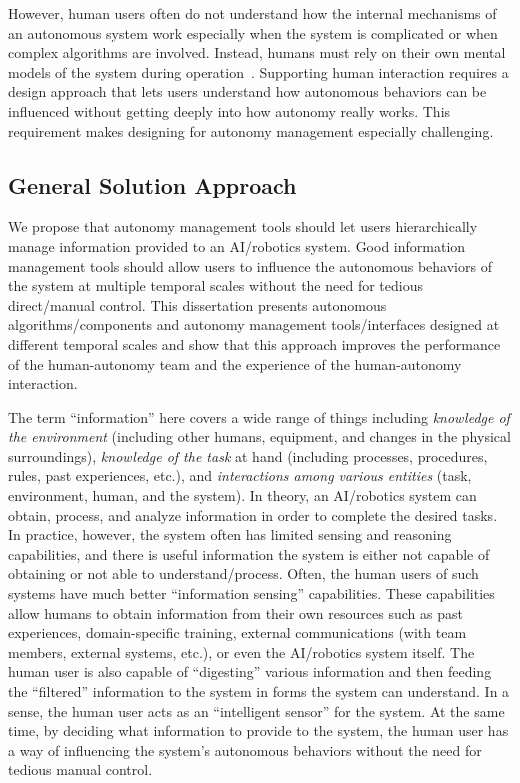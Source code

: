 However, human users often do not understand how the internal mechanisms of an autonomous system work especially when the system is complicated or when complex algorithms are involved. Instead, humans must rely on their own mental models of the system during operation~\cite{Moray1999Mental}. Supporting human interaction requires a design approach that lets users understand how autonomous behaviors can be influenced without getting deeply into how autonomy really works. This requirement makes designing for autonomy management especially challenging.

\subsection{General Solution Approach}

We propose that autonomy management tools should let users hierarchically manage information provided to an AI/robotics system. Good information management tools should allow users to influence the autonomous behaviors of the system at multiple temporal scales without the need for tedious direct/manual control. This dissertation presents autonomous algorithms/components and autonomy management tools/interfaces designed at different temporal scales and show that this approach improves the performance of the human-autonomy team and the experience of the human-autonomy interaction.

The term ``information'' here covers a wide range of things including \textit{knowledge of the environment} (including other humans, equipment, and changes in the physical surroundings), \textit{knowledge of the task} at hand (including processes, procedures, rules, past experiences, etc.), and \textit{interactions among various entities} (task, environment, human, and the system). In theory, an AI/robotics system can obtain, process, and analyze information in order to complete the desired tasks. In practice, however, the system often has limited sensing and reasoning capabilities, and there is useful information the system is either not capable of obtaining or not able to understand/process. Often, the human users of such systems have much better ``information sensing'' capabilities. These capabilities allow humans to obtain information from their own resources such as past experiences, domain-specific training, external communications (with team members, external systems, etc.), or even the AI/robotics system itself. The human user is also capable of ``digesting'' various information and then feeding the ``filtered'' information to the system in forms the system can understand. In a sense, the human user acts as an ``intelligent sensor'' for the system. At the same time, by deciding what information to provide to the system, the human user has a way of influencing the system's autonomous behaviors without the need for tedious manual control.

